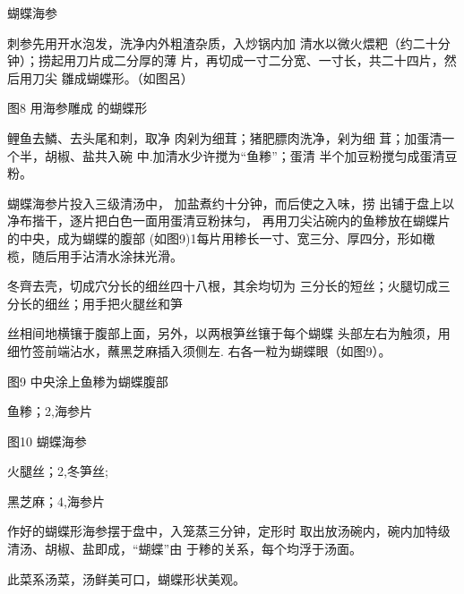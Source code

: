 \begin{recipe}{蝴蝶海参}

\ingredients



\cooking

\step 刺参先用开水泡发，洗净内外粗渣杂质，入炒锅内加 清水以微火煨粑（约二十分钟）；捞起用刀片成二分厚的薄 片，再切成一寸二分宽、一寸长，共二十四片，然后用刀尖 雛成蝴蝶形。（如图呂）

图8 用海参雕成 的蝴蝶形

\step 鲤鱼去鱗、去头尾和刺，取净 肉剁为细茸；猪肥膘肉洗净，剁为细 茸；加蛋清一个半，胡椒、盐共入碗 中.加清水少许搅为“鱼糁”；蛋清 半个加豆粉搅匀成蛋清豆粉。

\step 蝴蝶海参片投入三级清汤中， 加盐煮约十分钟，而后使之入味，捞 出铺于盘上以净布揩干，逐片把白色一面用蛋清豆粉抹匀， 再用刀尖沾碗内的鱼糁放在蝴蝶片的中央，成为蝴蝶的腹部 (如图9)1每片用糁长一寸、宽三分、厚四分，形如橄 榄，随后用手沾清水涂抹光滑。

\step 冬齊去壳，切成穴分长的细丝四十八根，其余均切为 三分长的短丝；火腿切成三分长的细丝；用手把火腿丝和笋

丝相间地横镶于腹部上面，另外，以两根笋丝镶于每个蝴蝶 头部左右为触须，用细竹签前端沾水，蘸黑芝麻插入须侧左. 右各一粒为蝴蝶眼（如图9）。

图9 中央涂上鱼糁为蝴蝶腹部

\step 鱼糁；2,海参片

图10 蝴蝶海参

\step 火腿丝；2,冬笋丝;

\step 黑芝麻；4,海参片

\step 作好的蝴蝶形海参摆于盘中，入笼蒸三分钟，定形时 取出放汤碗内，碗内加特级清汤、胡椒、盐即成，“蝴蝶”由 于糁的关系，每个均浮于汤面。

\notes

此菜系汤菜，汤鲜美可口，蝴蝶形状美观。

\end{recipe}

